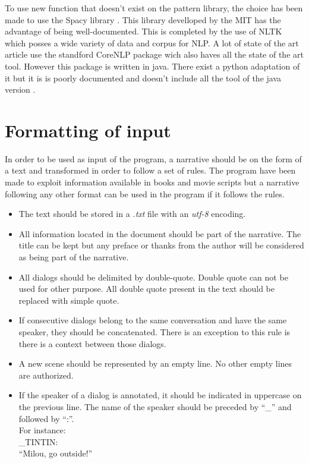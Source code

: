 \documentclass[a4paper, 12pt]{report}
\begin{document}
To use new function that doesn't exist on the pattern library, the choice has been made to use the Spacy library \citep{spacy}. This library develloped by the MIT has the advantage of being well-documented. This is completed by the use of NLTK \citep{NLTK} which posses a wide variety of data and corpus for NLP.  A lot of state of the art article use the standford CoreNLP package \citep{CoreNLP} wich also haves all the state of the art tool. However this package is written in java. There exist a python adaptation of it but it is is poorly documented and doesn't include all the tool of the java version \citep{CoreNLPPython}.\\



\section{Formatting of input}
In order to be used as input of the program, a narrative should be on the form of a text and  transformed in order to follow a set of rules. The program have been made to exploit information available in books and movie scripts but a narrative following any other format can be used in the program if it follows the rules.

\begin{itemize}
\item The text should be stored in a \textit{.txt} file with an \textit{utf-8} encoding.
\item All information located in the document should be part of the narrative. The title can be kept but any preface or thanks from the author will be considered as being part of the narrative.
\item All dialogs should be delimited by double-quote. Double quote can not be used for other purpose. All double quote present in the text should be replaced with simple quote.
\item If consecutive dialogs belong to the same conversation and have the same speaker, they should be concatenated. There is an exception to this rule is there is a context between those dialogs.
\item A new scene should be represented by an empty line. No other empty lines are authorized.
\item If the speaker of a dialog is annotated, it should be indicated in uppercase on the previous line. The name of the speaker should be preceded by ``\_'' and followed by  ``:''.\\
 For instance: \\
	\_TINTIN:\\
	``Milou, go outside!''\\
\end{itemize}
\end{document}

